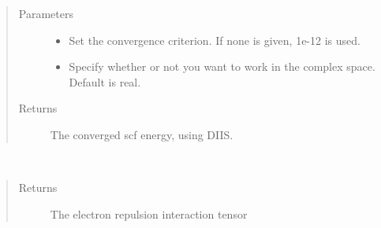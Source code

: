 \documentclass[letterpaper,10pt,english]{sphinxmanual}
\begin{document}
\begin{fulllineitems}
\begin{fulllineitems}
\begin{sphinxVerbatim}[commandchars=\\\{\}]
   
       
   
\end{sphinxVerbatim}
\begin{quote}\begin{description}
\item[{Parameters}] \leavevmode\begin{itemize}
\item {} 
 \textendash{} Set the convergence criterion. If none is given, 1e-12 is used.

\item {} 
 \textendash{} Specify whether or not you want to work in the complex space. Default is real.

\end{itemize}

\item[{Returns}] \leavevmode
The converged scf energy, using DIIS.

\end{description}\end{quote}

\end{fulllineitems}


\begin{fulllineitems}
\label{\detokenize{RHF:hf.HartreeFock.RHF.MF.get_two_e}}~\begin{quote}\begin{description}
\item[{Returns}] \leavevmode
The electron repulsion interaction tensor


\end{description}
\end{quote}
\end{fulllineitems}
\end{fulllineitems}
\end{document}
